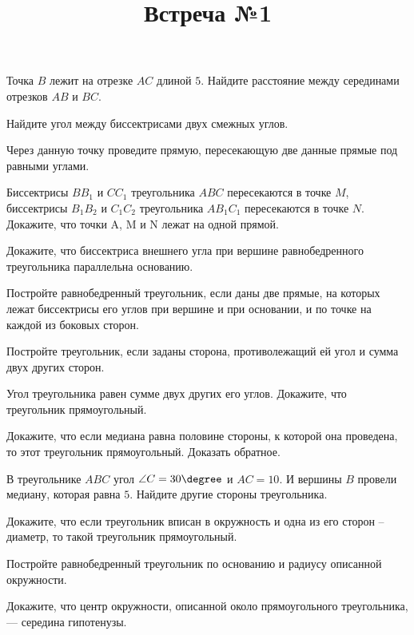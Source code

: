 
\title{Встреча №1}
\begin{listofex}
	\item Точка \( B \) лежит на отрезке \( AC \) длиной \( 5 \). Найдите расстояние между серединами отрезков \( AB \) и \( BC \).
	\item Найдите угол между биссектрисами двух смежных углов.
	\item {}
	\item {}
	\item Через данную точку проведите прямую, пересекающую две данные прямые под равными углами.
	\item {}
	\item Биссектрисы \( BB_1 \) и \( CC_1 \) треугольника \( ABC \) пересекаются в точке \( M \), биссектрисы \( B_1B_2 \) и \( C_1C_2 \) треугольника \( AB_1C_1 \) пересекаются в точке \( N \). Докажите, что точки A, M и N лежат на одной прямой.
	\item Докажите, что биссектриса внешнего угла при вершине равнобедренного треугольника параллельна основанию.
	\item Постройте равнобедренный треугольник, если даны две прямые, на которых лежат биссектрисы его углов при вершине и при основании, и по точке на каждой из боковых сторон.
	\item Постройте треугольник, если заданы сторона, противолежащий ей угол и сумма двух других сторон.
	
	\item {}
	\item {}
	
	\item Угол треугольника равен сумме двух других его углов. Докажите, что треугольник прямоугольный.
	\item Докажите, что если медиана равна половине стороны, к которой она проведена, то этот треугольник прямоугольный. Доказать обратное.
	\item В треугольнике \( ABC \) угол \( \angle C = 30\degree \) и \( AC = 10 \). И вершины \( B \) провели медиану, которая равна \( 5 \). Найдите другие стороны треугольника.
	\item Докажите, что если треугольник вписан в окружность и одна из его сторон -- диаметр, то такой треугольник прямоугольный.
	\item Постройте равнобедренный треугольник по основанию и радиусу описанной окружности.
	\item Докажите, что центр окружности, описанной около прямоугольного треугольника, --- середина гипотенузы.
	

\end{listofex}
